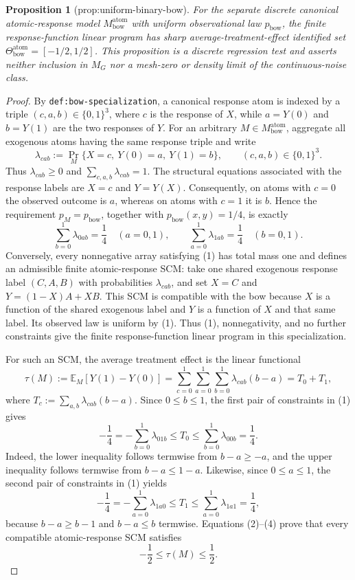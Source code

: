 \documentclass{article}
\newtheorem{proposition}{Proposition}
\begin{document}
\begin{proposition}[prop:uniform-binary-bow]\label{prop:uniform-binary-bow}
For the separate discrete canonical atomic-response model \(M_{\mathrm{bow}}^{\mathrm{atom}}\) with uniform observational law \(p_{\mathrm{bow}}\), the finite response-function linear program has sharp average-treatment-effect identified set \(\Theta_{\mathrm{bow}}^{\mathrm{atom}}=[-1/2,1/2]\). This proposition is a discrete regression test and asserts neither inclusion in \(M_G\) nor a mesh-zero or density limit of the continuous-noise class.
\end{proposition}
\begin{proof}
By \texttt{def:bow-specialization}, a canonical response atom is indexed by a triple \((c,a,b)\in\{0,1\}^3\), where \(c\) is the response of \(X\), while \(a=Y(0)\) and \(b=Y(1)\) are the two responses of \(Y\).  For an arbitrary \(M\in M_{\mathrm{bow}}^{\mathrm{atom}}\), aggregate all exogenous atoms having the same response triple and write
\[
  \lambda_{cab}:=\Pr_M\{X=c,\ Y(0)=a,\ Y(1)=b\},
  \qquad (c,a,b)\in\{0,1\}^3.
\]
Thus \(\lambda_{cab}\ge 0\) and \(\sum_{c,a,b}\lambda_{cab}=1\).  The structural equations associated with the response labels are \(X=c\) and \(Y=Y(X)\).  Consequently, on atoms with \(c=0\) the observed outcome is \(a\), whereas on atoms with \(c=1\) it is \(b\).  Hence the requirement \(p_M=p_{\mathrm{bow}}\), together with \(p_{\mathrm{bow}}(x,y)=1/4\), is exactly
\[
  \sum_{b=0}^1\lambda_{0ab}=\frac14
  \quad(a=0,1),
  \qquad
  \sum_{a=0}^1\lambda_{1ab}=\frac14
  \quad(b=0,1).
  \tag{1}
\]
Conversely, every nonnegative array satisfying (1) has total mass one and defines an admissible finite atomic-response SCM: take one shared exogenous response label \((C,A,B)\) with probabilities \(\lambda_{cab}\), and set \(X=C\) and \(Y=(1-X)A+XB\).  This SCM is compatible with the bow because \(X\) is a function of the shared exogenous label and \(Y\) is a function of \(X\) and that same label.  Its observed law is uniform by (1).  Thus (1), nonnegativity, and no further constraints give the finite response-function linear program in this specialization.

For such an SCM, the average treatment effect is the linear functional
\[
  \tau(M):=\mathbb E_M[Y(1)-Y(0)]
  =\sum_{c=0}^1\sum_{a=0}^1\sum_{b=0}^1
    \lambda_{cab}(b-a)
  =T_0+T_1,
  \tag{2}
\]
where \(T_c:=\sum_{a,b}\lambda_{cab}(b-a)\).  Since \(0\le b\le 1\), the first pair of constraints in (1) gives
\[
  -\frac14
  =-\sum_{b=0}^1\lambda_{01b}
  \le T_0
  \le \sum_{b=0}^1\lambda_{00b}
  =\frac14.
  \tag{3}
\]
Indeed, the lower inequality follows termwise from \(b-a\ge -a\), and the upper inequality follows termwise from \(b-a\le 1-a\).  Likewise, since \(0\le a\le 1\), the second pair of constraints in (1) yields
\[
  -\frac14
  =-\sum_{a=0}^1\lambda_{1a0}
  \le T_1
  \le \sum_{a=0}^1\lambda_{1a1}
  =\frac14,
  \tag{4}
\]
because \(b-a\ge b-1\) and \(b-a\le b\) termwise.  Equations (2)--(4) prove that every compatible atomic-response SCM satisfies
\[
  -\frac12\le \tau(M)\le\frac12.
  \tag{5}
\]


\end{proof}
\end{document}

